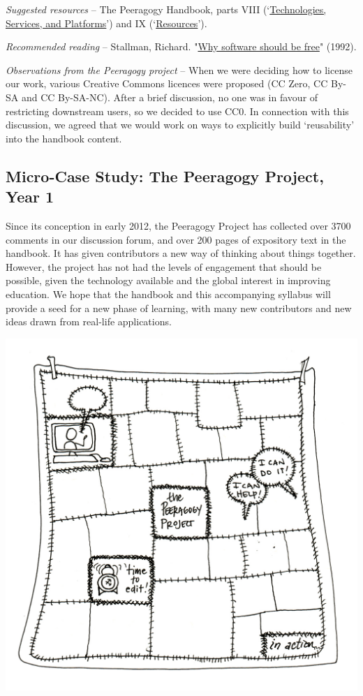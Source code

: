 \emph{Suggested resources} -- The Peeragogy Handbook, parts VIII
(`\href{http://peeragogy.org/resources/technologies/}{Technologies,
Services, and Platforms}') and IX
(`\href{http://peeragogy.org/resources/}{Resources}').

\emph{Recommended reading} -- Stallman, Richard.
"\href{http://www.gnu.org/philosophy/shouldbefree.html}{Why software
should be free}" (1992).

\emph{Observations from the Peeragogy project} -- When we were deciding
how to license our work, various Creative Commons licences were proposed
(CC Zero, CC By-SA and CC By-SA-NC). After a brief discussion, no one
was in favour of restricting downstream users, so we decided to use CC0.
In connection with this discussion, we agreed that we would work on ways
to explicitly build `reusability' into the handbook content.

\subsection{Micro-Case Study: The Peeragogy Project, Year 1}

Since its conception in early 2012, the Peeragogy Project has collected
over 3700 comments in our discussion forum, and over 200 pages of
expository text in the handbook. It has given contributors a new way of
thinking about things together. However, the project has not had the
levels of engagement that should be possible, given the technology
available and the global interest in improving education. We hope that
the handbook and this accompanying syllabus will provide a seed for a
new phase of learning, with many new contributors and new ideas drawn
from real-life applications.

\begin{center}
\includegraphics{../pictures/OpenBook-3.jpg}
\end{center}
